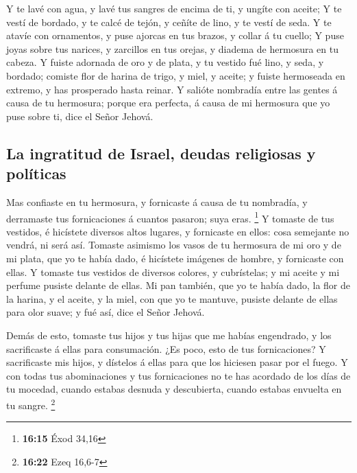  Y te lavé con agua, y lavé tus sangres de encima de ti, y
ungíte con aceite;  Y te vestí de bordado, y te calcé de
tejón, y ceñíte de lino, y te vestí de seda.  Y te atavíe
con ornamentos, y puse ajorcas en tus brazos, y collar á tu cuello;
 Y puse joyas sobre tus narices, y zarcillos en tus
orejas, y diadema de hermosura en tu cabeza.  Y fuiste
adornada de oro y de plata, y tu vestido fué lino, y seda, y bordado;
comiste flor de harina de trigo, y miel, y aceite; y fuiste hermoseada
en extremo, y has prosperado hasta reinar.  Y salióte
nombradía entre las gentes á causa de tu hermosura; porque era perfecta,
á causa de mi hermosura que yo puse sobre ti, dice el Señor Jehová.

\hypertarget{la-ingratitud-de-israel-deudas-religiosas-y-poluxedticas}{%
\subsection{La ingratitud de Israel, deudas religiosas y
políticas}\label{la-ingratitud-de-israel-deudas-religiosas-y-poluxedticas}}

 Mas confiaste en tu hermosura, y fornicaste á causa de
tu nombradía, y derramaste tus fornicaciones á cuantos pasaron; suya
eras. \footnote{\textbf{16:15} Éxod 34,16}  Y tomaste de
tus vestidos, é hicístete diversos altos lugares, y fornicaste en ellos:
cosa semejante no vendrá, ni será así.  Tomaste asimismo
los vasos de tu hermosura de mi oro y de mi plata, que yo te había dado,
é hicístete imágenes de hombre, y fornicaste con ellas. 
Y tomaste tus vestidos de diversos colores, y cubrístelas; y mi aceite y
mi perfume pusiste delante de ellas.  Mi pan también, que
yo te había dado, la flor de la harina, y el aceite, y la miel, con que
yo te mantuve, pusiste delante de ellas para olor suave; y fué así, dice
el Señor Jehová.

 Demás de esto, tomaste tus hijos y tus hijas que me
habías engendrado, y los sacrificaste á ellas para consumación. ¿Es
poco, esto de tus fornicaciones?  Y sacrificaste mis
hijos, y dístelos á ellas para que los hiciesen pasar por el fuego.
 Y con todas tus abominaciones y tus fornicaciones no te
has acordado de los días de tu mocedad, cuando estabas desnuda y
descubierta, cuando estabas envuelta en tu sangre. \footnote{\textbf{16:22}
  Ezeq 16,6-7}

